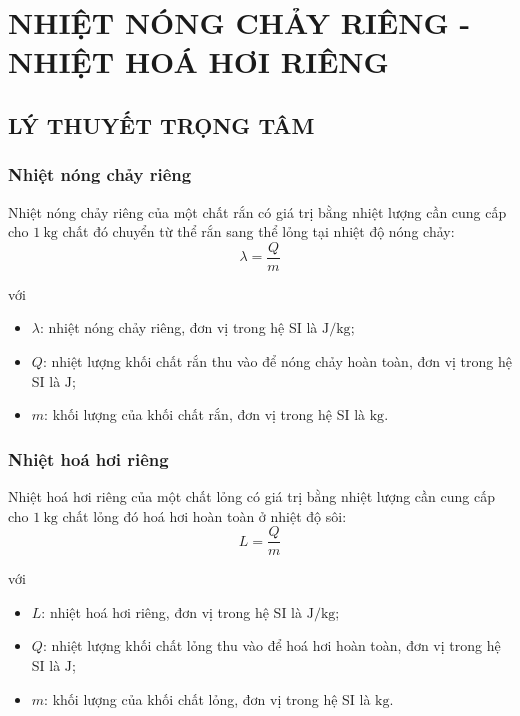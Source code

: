 \section{NHIỆT NÓNG CHẢY RIÊNG - NHIỆT HOÁ HƠI RIÊNG}
\subsection{LÝ THUYẾT TRỌNG TÂM}
\begin{tomtat}
	\subsubsection{Nhiệt nóng chảy riêng}
	\begin{dn}
		Nhiệt nóng chảy riêng của một chất rắn có giá trị bằng nhiệt lượng cần cung cấp cho $\SI{1}{\kilogram}$ chất đó chuyển từ thể rắn sang thể lỏng tại nhiệt độ nóng chảy:
		\begin{equation}
			\lambda=\dfrac{Q}{m}
		\end{equation}
	\end{dn}
	với
	\begin{itemize}
		\item $\lambda$: nhiệt nóng chảy riêng, đơn vị trong hệ SI là $\si{\joule/\kilogram}$;
		\item $Q$: nhiệt lượng khối chất rắn thu vào để nóng chảy hoàn toàn, đơn vị trong hệ SI là $\si{\joule}$;
		\item $m$: khối lượng của khối chất rắn, đơn vị trong hệ SI là $\si{\kilogram}$.
	\end{itemize}
	\subsubsection{Nhiệt hoá hơi riêng}
	\begin{dn}
		Nhiệt hoá hơi riêng của một chất lỏng có giá trị bằng nhiệt lượng cần cung cấp cho $\SI{1}{\kilogram}$ chất lỏng đó hoá hơi hoàn toàn ở nhiệt độ sôi:
		\begin{equation}
			L=\dfrac{Q}{m}
		\end{equation}
	\end{dn}
	với
	\begin{itemize}
		\item $L$: nhiệt hoá hơi riêng, đơn vị trong hệ SI là $\si{\joule/\kilogram}$;
		\item $Q$: nhiệt lượng khối chất lỏng thu vào để hoá hơi hoàn toàn, đơn vị trong hệ SI là $\si{\joule}$;
		\item $m$: khối lượng của khối chất lỏng, đơn vị trong hệ SI là $\si{\kilogram}$.
	\end{itemize}
\end{tomtat}
